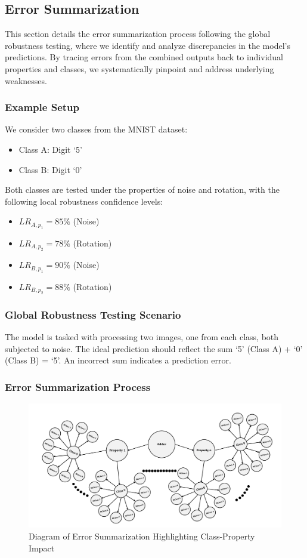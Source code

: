 \documentclass[10pt, conference, a4paper, final]{IEEEtran}
\begin{document}
\subsection{Error Summarization}
This section details the error summarization process following the global robustness testing, where we identify and analyze discrepancies in the model's predictions. By tracing errors from the combined outputs back to individual properties and classes, we systematically pinpoint and address underlying weaknesses.

\subsubsection{Example Setup}
We consider two classes from the MNIST dataset:
\begin{itemize}
    \item Class A: Digit `5'
    \item Class B: Digit `0'
\end{itemize}
Both classes are tested under the properties of noise and rotation, with the following local robustness confidence levels:
\begin{itemize}
    \item \( LR_{A,p_1} = 85\% \) (Noise)
    \item \( LR_{A,p_2} = 78\% \) (Rotation)
    \item \( LR_{B,p_1} = 90\% \) (Noise)
    \item \( LR_{B,p_2} = 88\% \) (Rotation)
\end{itemize}

\subsubsection{Global Robustness Testing Scenario}
The model is tasked with processing two images, one from each class, both subjected to noise. The ideal prediction should reflect the sum `5' (Class A) + `0' (Class B) = `5'. An incorrect sum indicates a prediction error.

\subsubsection{Error Summarization Process}

\begin{figure}[H]
    \centering
    \includegraphics[width=\linewidth]{paper_images/step4.pdf}
    \caption{Diagram of Error Summarization Highlighting Class-Property Impact}
    \label{fig:error-summarization}
\end{figure}
\end{document}
